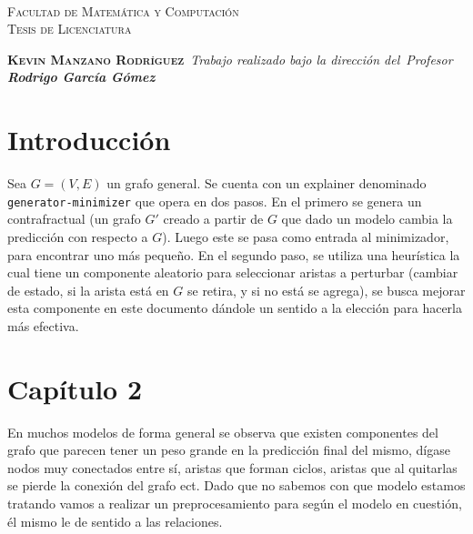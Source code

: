 \documentclass[11pt,letterpaper]{report} \usepackage[utf8]{inputenc} \usepackage[spanish]{babel}
\begin{document}
\thispagestyle{empty} \\{\scshape\LARGE Facultad de Matem\'atica y Computaci\'on}\\ {\scshape\LARGE Tesis de Licenciatura}\ \bigskip \par\vspace{4cm} {\scshape\LARGE \textbf{Kevin Manzano Rodr\'iguez}}\ \medskip \textit{Trabajo realizado bajo la dirección del}\ \textit{Profesor \textbf{Rodrigo Garc\'ia G\'omez}}\ \vspace*{2cm}

\begin{abstract} \centering \large Propuesta de heur\'istica para mejorar la elecci\'on de aristas para perturbar en el minimizador. \end{abstract}

\tableofcontents \newpage

\chapter{Introducción} 
Sea $G=(V,E)$ un grafo general. Se cuenta con un explainer denominado \texttt{generator-minimizer} que opera en dos pasos. En el primero se genera un contrafractual (un grafo $G'$ creado a partir de $G$ que dado un modelo cambia la predicci\'on con respecto a $G$). Luego este se pasa como entrada al minimizador, para encontrar uno m\'as pequeño. En el segundo paso, se utiliza una heur\'istica la cual tiene un componente aleatorio para seleccionar aristas a perturbar (cambiar de estado, si la arista est\'a en $G$ se retira, y si no est\'a se agrega), se busca mejorar esta componente en este documento d\'andole un sentido a la elecci\'on para hacerla m\'as efectiva.

\chapter{Capítulo 2}

En muchos modelos de forma general se observa que existen componentes del grafo que parecen tener un peso grande en la predicci\'on final del mismo, d\'igase nodos muy conectados entre s\'i, aristas que forman ciclos, aristas que al quitarlas se pierde la conexi\'on del grafo ect. Dado que no sabemos con que modelo estamos tratando vamos a realizar un preprocesamiento para seg\'un el modelo en cuesti\'on, \'el mismo le de sentido a las relaciones.\\
\end{document}
